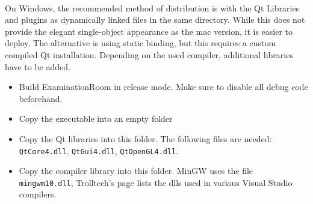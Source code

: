 \paragraph{}
On Windows, the recommended method of distribution is with the Qt Libraries and plugins as dynamically linked files in the same directory.
While this does not provide the elegant single-object appearance as the mac version, it is easier to deploy.
The alternative is using static binding, but this requires a custom compiled Qt installation.
Depending on the used compiler, additional libraries have to be added.

\begin{itemize}
\item Build ExaminationRoom in release mode.
Make sure to disable all debug code beforehand.
\item Copy the executable into an empty folder
\item Copy the Qt libraries into this folder.
The following files are needed: \texttt{QtCore4.dll}, \texttt{QtGui4.dll}, \texttt{QtOpenGL4.dll}.
\item Copy the compiler library into this folder.
MinGW uses the file \texttt{mingwm10.dll}, Trolltech's page lists the dlls used in various Visual Studio compilers.
\end{itemize}
